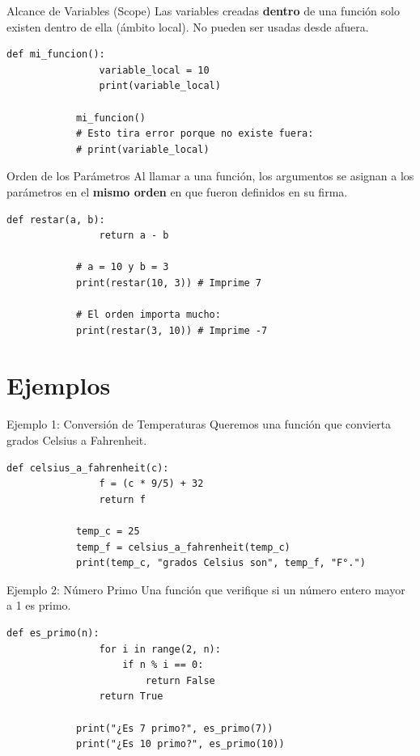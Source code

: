 \documentclass[aspectratio=169, 11pt]{beamer}
\begin{document}
	\begin{frame}[fragile]{Alcance de Variables (Scope)}
		Las variables creadas \textbf{dentro} de una función solo existen dentro de ella (ámbito local). No pueden ser usadas desde afuera.
		
		\begin{lstlisting}[gobble=3]
			def mi_funcion():
				variable_local = 10
				print(variable_local)
				
			mi_funcion()
			# Esto tira error porque no existe fuera:
			# print(variable_local) 
		\end{lstlisting}
	\end{frame}
	
	\begin{frame}[fragile]{Orden de los Parámetros}
		Al llamar a una función, los argumentos se asignan a los parámetros en el \textbf{mismo orden} en que fueron definidos en su firma.
		
		\begin{lstlisting}[gobble=3]
			def restar(a, b):
				return a - b
				
			# a = 10 y b = 3
			print(restar(10, 3)) # Imprime 7
			
			# El orden importa mucho:
			print(restar(3, 10)) # Imprime -7
		\end{lstlisting}
	\end{frame}
	
	\section{Ejemplos}
	
	\begin{frame}[fragile]{Ejemplo 1: Conversión de Temperaturas}
		Queremos una función que convierta grados Celsius a Fahrenheit.
		
		\begin{lstlisting}[gobble=3]
			def celsius_a_fahrenheit(c):
				f = (c * 9/5) + 32
				return f
				
			temp_c = 25
			temp_f = celsius_a_fahrenheit(temp_c)
			print(temp_c, "grados Celsius son", temp_f, "F°.")
		\end{lstlisting}
	\end{frame}
	
	\begin{frame}[fragile]{Ejemplo 2: Número Primo}
		Una función que verifique si un número entero mayor a 1 es primo.
		
		\begin{lstlisting}[gobble=3]
			def es_primo(n):
				for i in range(2, n):
					if n % i == 0:
						return False
				return True
				
			print("¿Es 7 primo?", es_primo(7))
			print("¿Es 10 primo?", es_primo(10))
		\end{lstlisting}
	\end{frame}
	
\end{document}
